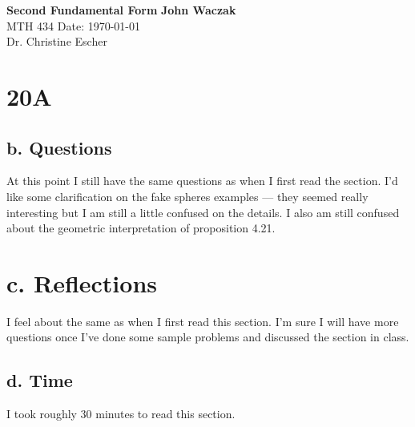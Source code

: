 \documentclass[a4paper, 11pt]{article}
\begin{document}
\noindent
\large\textbf{Second Fundamental Form} \hfill \textbf{John Waczak} \\
\normalsize MTH 434 \hfill  Date: \today \\
Dr. Christine Escher \\

\section*{20A}
	\subsection*{b. Questions}
	 
	 At this point I still have the same questions as when I first read the section. I'd like some clarification on the fake spheres examples --- they seemed really interesting but I am still a little confused on the details. I also am still confused about the geometric interpretation of proposition 4.21. 
	
	\section*{c. Reflections}
	I feel about the same as when I first read this section. I'm sure I will have more questions once I've done some sample problems and discussed the section in class.
	
	
	\subsection*{d. Time}
	I took roughly 30 minutes to read this section. 
\end{document}
